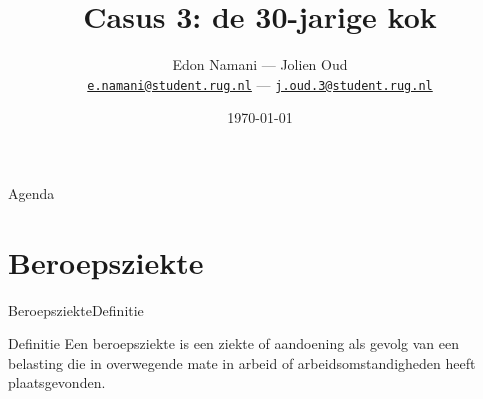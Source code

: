\documentclass[aspectratio=169]{beamer}
\title[Beroepsallergie]{Casus 3: de 30-jarige kok}
\date{\today}
\author[Edon Namani, et. al]
{%
	Edon Namani --- Jolien Oud\\
	\href{mailto:e.namani@student.rug.nl}{{\tt e.namani@student.rug.nl}} --- \href{mailto:j.oud.3@student.rug.nl}{{\tt j.oud.3@student.rug.nl}}
}
\institute[%
	Faculteit Gezondheidswetenschappen\\
	Rijksuniversiteit Groningen\\
	Nederland
]
{%
	Faculteit Gezondheidswetenschappen\\
	Rijksuniversiteit Groningen\\
	Nederland

}
\begin{document}
{\aauwavesbg%
	\begin{frame}
	\titlepage
\end{frame}}

\begin{frame}{Agenda}{}
	\tableofcontents
\end{frame}
\section{Beroepsziekte}
\begin{frame}{Beroepsziekte}{Definitie}
    \begin{alertblock}{Definitie}
        Een beroepsziekte is een ziekte of aandoening als gevolg van een belasting die in overwegende mate in arbeid of arbeidsomstandigheden heeft plaatsgevonden.
    \end{alertblock}
\end{frame}
\end{document}
